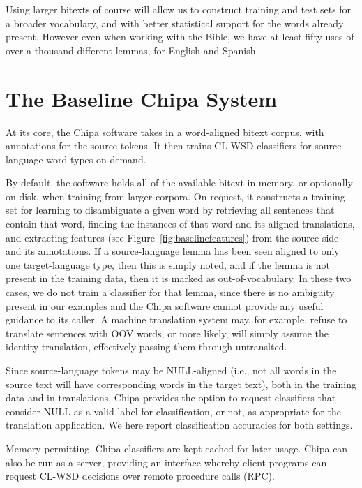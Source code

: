 Using larger bitexts of course will allow us to construct training and test
sets for a broader vocabulary, and with better statistical support for the
words already present. However even when working with the Bible, we
have at least fifty uses of over a thousand different lemmas, for English and
Spanish.

\section{The Baseline Chipa System}
At its core, the Chipa software takes in a word-aligned bitext corpus, with
annotations for the source tokens. It then trains CL-WSD classifiers for
source-language word types on demand. 

By default, the software holds all of the available bitext in memory, or
optionally on disk, when training from larger corpora. On request, it
constructs a training set for learning to disambiguate a given word
by retrieving all sentences that contain that word,
finding the instances of that word and its aligned translations, and extracting
features (see Figure~\ref{fig:baselinefeatures}) from the source side and its
annotations.
If a source-language lemma has been seen aligned to only one target-language
type, then this is simply noted, and if the lemma is not present in the
training data, then it is marked as out-of-vocabulary. In these two
cases, we do not train a classifier for that lemma, since there is no
ambiguity present in our examples and the Chipa software cannot provide any
useful guidance to its caller. A machine translation system may, for example,
refuse to translate sentences with OOV words, or more likely, will simply
assume the identity translation, effectively passing them through untranslted.

Since source-language tokens may be NULL-aligned (i.e., not all words in the
source text will have corresponding words in the target text), both in the
training data and in translations, Chipa provides the option to request
classifiers that consider NULL as a valid label for classification, or not, as
appropriate for the translation application. We here report classification
accuracies for both settings.

Memory permitting, Chipa classifiers are kept cached for later usage. Chipa can
also be run as a server, providing an interface whereby client programs can
request CL-WSD decisions over remote procedure calls (RPC).

